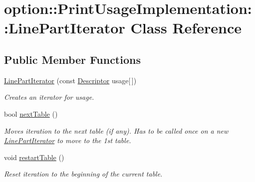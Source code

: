\hypertarget{classoption_1_1_print_usage_implementation_1_1_line_part_iterator}{}\section{option\+:\+:Print\+Usage\+Implementation\+:\+:Line\+Part\+Iterator Class Reference}
\label{classoption_1_1_print_usage_implementation_1_1_line_part_iterator}
\subsection*{Public Member Functions}
\begin{DoxyCompactItemize}
\item 
\mbox{\label{classoption_1_1_print_usage_implementation_1_1_line_part_iterator_a8a61fef9ba907fd4e10ff0fd772ee5e7}} 
\hyperlink{classoption_1_1_print_usage_implementation_1_1_line_part_iterator_a8a61fef9ba907fd4e10ff0fd772ee5e7}{Line\+Part\+Iterator} (const \hyperlink{structoption_1_1_descriptor}{Descriptor} usage\mbox{[}$\,$\mbox{]})
\begin{DoxyCompactList}\small\item\em Creates an iterator for {\ttfamily usage}. \end{DoxyCompactList}\item 
bool \hyperlink{classoption_1_1_print_usage_implementation_1_1_line_part_iterator_afe43ca12d399ed3c871e4dc5bf63356e}{next\+Table} ()
\begin{DoxyCompactList}\small\item\em Moves iteration to the next table (if any). Has to be called once on a new \hyperlink{classoption_1_1_print_usage_implementation_1_1_line_part_iterator}{Line\+Part\+Iterator} to move to the 1st table. \end{DoxyCompactList}\item 
\mbox{\label{classoption_1_1_print_usage_implementation_1_1_line_part_iterator_a0cbe8ed79ab4958a70b957598dd76fa6}} 
void \hyperlink{classoption_1_1_print_usage_implementation_1_1_line_part_iterator_a0cbe8ed79ab4958a70b957598dd76fa6}{restart\+Table} ()
\begin{DoxyCompactList}\small\item\em Reset iteration to the beginning of the current table. \end{DoxyCompactList}\item 

\end{DoxyCompactItemize}
